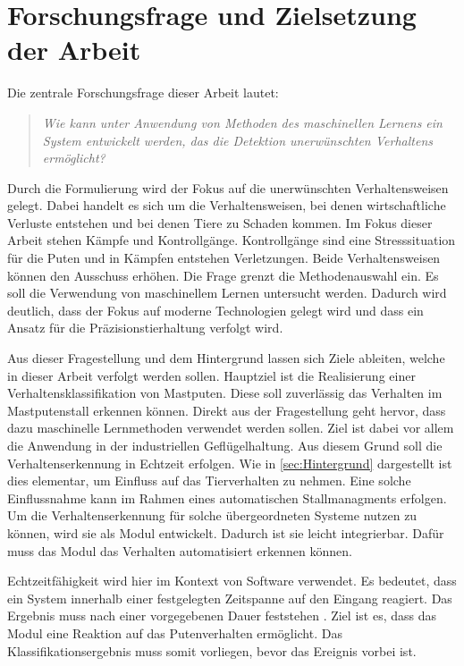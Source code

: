\section{Forschungsfrage und Zielsetzung der Arbeit} \label{sec:Zielsetzung}

Die zentrale Forschungsfrage dieser Arbeit lautet: 

\begin{quote}
    \textit{Wie kann unter Anwendung von Methoden des maschinellen Lernens ein System entwickelt werden, das die Detektion unerwünschten Verhaltens ermöglicht?}
\end{quote}

Durch die Formulierung wird der Fokus auf die unerwünschten Verhaltensweisen gelegt. Dabei handelt es sich um die Verhaltensweisen, bei denen wirtschaftliche Verluste entstehen und bei denen Tiere zu Schaden kommen. Im Fokus dieser Arbeit stehen Kämpfe und Kontrollgänge. Kontrollgänge sind eine Stresssituation für die Puten und in Kämpfen entstehen Verletzungen. Beide Verhaltensweisen können den Ausschuss erhöhen.
Die Frage grenzt die Methodenauswahl ein. Es soll die Verwendung von maschinellem Lernen untersucht werden. Dadurch wird deutlich, dass der Fokus auf moderne Technologien gelegt wird und dass ein Ansatz für die Präzisionstierhaltung verfolgt wird. \par

Aus dieser Fragestellung und dem Hintergrund lassen sich Ziele ableiten, welche in dieser Arbeit verfolgt werden sollen. Hauptziel ist die Realisierung einer Verhaltensklassifikation von Mastputen. Diese soll zuverlässig das Verhalten im Mastputenstall erkennen können. Direkt aus der Fragestellung geht hervor, dass dazu maschinelle Lernmethoden verwendet werden sollen. Ziel ist dabei vor allem die Anwendung in der industriellen Geflügelhaltung. Aus diesem Grund soll die Verhaltenserkennung in Echtzeit erfolgen. Wie in \autoref{sec:Hintergrund} dargestellt ist dies elementar, um Einfluss auf das Tierverhalten zu nehmen. Eine solche Einflussnahme kann im Rahmen eines automatischen Stallmanagments erfolgen. Um die Verhaltenserkennung für solche übergeordneten Systeme nutzen zu können, wird sie als Modul entwickelt. Dadurch ist sie leicht integrierbar. Dafür muss das Modul das Verhalten automatisiert erkennen können.\par

Echtzeitfähigkeit wird hier im Kontext von Software verwendet. Es bedeutet, dass ein System innerhalb einer festgelegten Zeitspanne auf den Eingang reagiert. Das Ergebnis muss nach einer vorgegebenen Dauer feststehen \cite{Scholz.2005}. Ziel ist es, dass das Modul eine Reaktion auf das Putenverhalten ermöglicht. Das Klassifikationsergebnis muss somit vorliegen, bevor das Ereignis vorbei ist.

